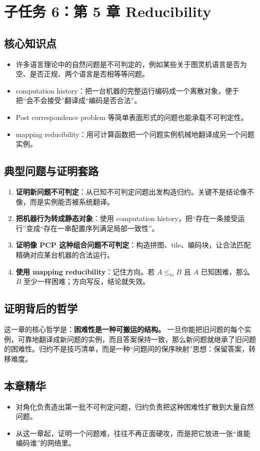 \section{子任务 6：第 5 章 Reducibility}

\subsection{核心知识点}

\begin{itemize}[leftmargin=2em]
  \item 许多语言理论中的自然问题是不可判定的，例如某些关于图灵机语言是否为空、是否正规、两个语言是否相等等问题。
  \item computation history：把一台机器的完整运行编码成一个离散对象，便于把“会不会接受”翻译成“编码是否合法”。
  \item Post correspondence problem 等简单表面形式的问题也能承载不可判定性。
  \item mapping reducibility：用可计算函数把一个问题实例机械地翻译成另一个问题实例。
\end{itemize}

\subsection{典型问题与证明套路}

\begin{enumerate}[leftmargin=2em]
  \item \textbf{证明新问题不可判定}：从已知不可判定问题出发构造归约。关键不是结论像不像，而是实例能否被系统翻译。
  \item \textbf{把机器行为转成静态对象}：使用 computation history，把“存在一条接受运行”变成“存在一串配置序列满足局部一致性”。
  \item \textbf{证明像 PCP 这种组合问题不可判定}：构造拼图、tile、编码块，让合法匹配精确对应某台机器的合法运行。
  \item \textbf{使用 mapping reducibility}：记住方向。若 $A \leq_m B$ 且 $A$ 已知困难，那么 $B$ 至少一样困难；方向写反，结论就失效。
\end{enumerate}

\subsection{证明背后的哲学}

这一章的核心哲学是：\textbf{困难性是一种可搬运的结构。}
一旦你能把旧问题的每个实例，可靠地翻译成新问题的实例，而且答案保持一致，那么新问题就继承了旧问题的困难性。归约不是技巧清单，而是一种“问题间的保序映射”思想：保留答案，转移难度。

\subsection{本章精华}

\begin{itemize}[leftmargin=2em]
  \item 对角化负责造出第一批不可判定问题，归约负责把这种困难性扩散到大量自然问题。
  \item 从这一章起，证明一个问题难，往往不再正面硬攻，而是把它放进一张“谁能编码谁”的网络里。
\end{itemize}

\newpage
